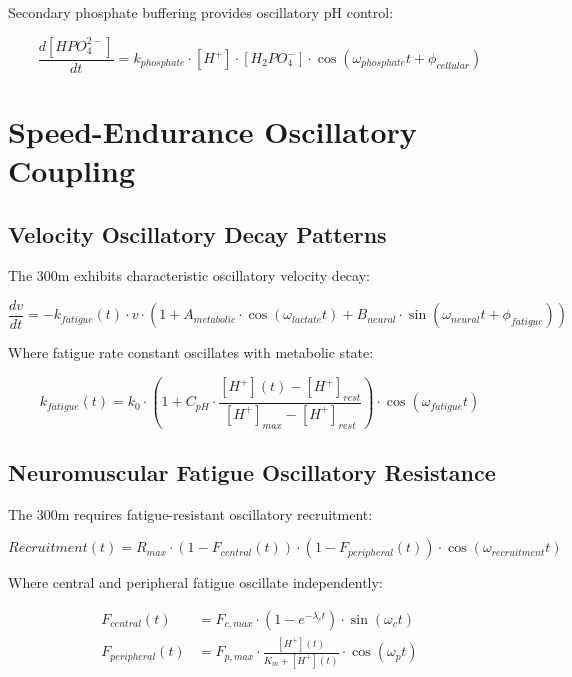 \documentclass[12pt]{article}
\begin{document}
Secondary phosphate buffering provides oscillatory pH control:

\begin{equation}
\frac{d[HPO_4^{2-}]}{dt} = k_{phosphate} \cdot [H^+] \cdot [H_2PO_4^-] \cdot \cos(\omega_{phosphate}t + \phi_{cellular})
\end{equation}

\section{Speed-Endurance Oscillatory Coupling}

\subsection{Velocity Oscillatory Decay Patterns}

The 300m exhibits characteristic oscillatory velocity decay:

\begin{equation}
\frac{dv}{dt} = -k_{fatigue}(t) \cdot v \cdot \left(1 + A_{metabolic} \cdot \cos(\omega_{lactate}t) + B_{neural} \cdot \sin(\omega_{neural}t + \phi_{fatigue})\right)
\end{equation}

Where fatigue rate constant oscillates with metabolic state:

\begin{equation}
k_{fatigue}(t) = k_0 \cdot \left(1 + C_{pH} \cdot \frac{[H^+](t) - [H^+]_{rest}}{[H^+]_{max} - [H^+]_{rest}}\right) \cdot \cos(\omega_{fatigue}t)
\end{equation}

\subsection{Neuromuscular Fatigue Oscillatory Resistance}

The 300m requires fatigue-resistant oscillatory recruitment:

\begin{equation}
Recruitment(t) = R_{max} \cdot \left(1 - F_{central}(t)\right) \cdot \left(1 - F_{peripheral}(t)\right) \cdot \cos(\omega_{recruitment}t)
\end{equation}

Where central and peripheral fatigue oscillate independently:

\begin{align}
F_{central}(t) &= F_{c,max} \cdot \left(1 - e^{-\lambda_c t}\right) \cdot \sin(\omega_c t) \\
F_{peripheral}(t) &= F_{p,max} \cdot \frac{[H^+](t)}{K_m + [H^+](t)} \cdot \cos(\omega_p t)
\end{align}
\end{document}
